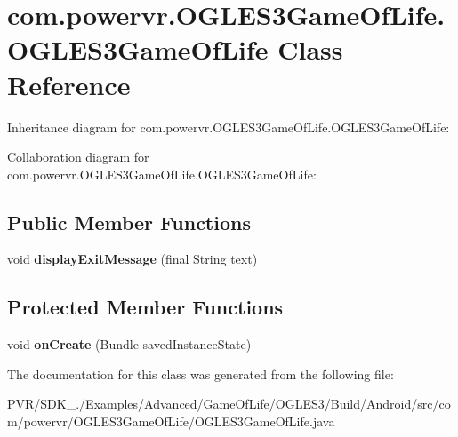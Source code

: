 \hypertarget{classcom_1_1powervr_1_1_o_g_l_e_s3_game_of_life_1_1_o_g_l_e_s3_game_of_life}{\section{com.\+powervr.\+O\+G\+L\+E\+S3\+Game\+Of\+Life.\+O\+G\+L\+E\+S3\+Game\+Of\+Life Class Reference}
\label{classcom_1_1powervr_1_1_o_g_l_e_s3_game_of_life_1_1_o_g_l_e_s3_game_of_life}
}


Inheritance diagram for com.\+powervr.\+O\+G\+L\+E\+S3\+Game\+Of\+Life.\+O\+G\+L\+E\+S3\+Game\+Of\+Life\+:


Collaboration diagram for com.\+powervr.\+O\+G\+L\+E\+S3\+Game\+Of\+Life.\+O\+G\+L\+E\+S3\+Game\+Of\+Life\+:
\subsection*{Public Member Functions}
\begin{DoxyCompactItemize}
\item 
\hypertarget{classcom_1_1powervr_1_1_o_g_l_e_s3_game_of_life_1_1_o_g_l_e_s3_game_of_life_a2b605339c2c1dc3300362c8ce87101a6}{void {\bfseries display\+Exit\+Message} (final String text)}\label{classcom_1_1powervr_1_1_o_g_l_e_s3_game_of_life_1_1_o_g_l_e_s3_game_of_life_a2b605339c2c1dc3300362c8ce87101a6}

\end{DoxyCompactItemize}
\subsection*{Protected Member Functions}
\begin{DoxyCompactItemize}
\item 
\hypertarget{classcom_1_1powervr_1_1_o_g_l_e_s3_game_of_life_1_1_o_g_l_e_s3_game_of_life_a8a6beefa1457821dfa8ee06a578d6878}{void {\bfseries on\+Create} (Bundle saved\+Instance\+State)}\label{classcom_1_1powervr_1_1_o_g_l_e_s3_game_of_life_1_1_o_g_l_e_s3_game_of_life_a8a6beefa1457821dfa8ee06a578d6878}

\end{DoxyCompactItemize}


The documentation for this class was generated from the following file\+:\begin{DoxyCompactItemize}
\item 
P\+V\+R/\+S\+D\+K\+\_./\+Examples/\+Advanced/\+Game\+Of\+Life/\+O\+G\+L\+E\+S3/\+Build/\+Android/src/com/powervr/\+O\+G\+L\+E\+S3\+Game\+Of\+Life/O\+G\+L\+E\+S3\+Game\+Of\+Life.\+java\end{DoxyCompactItemize}
